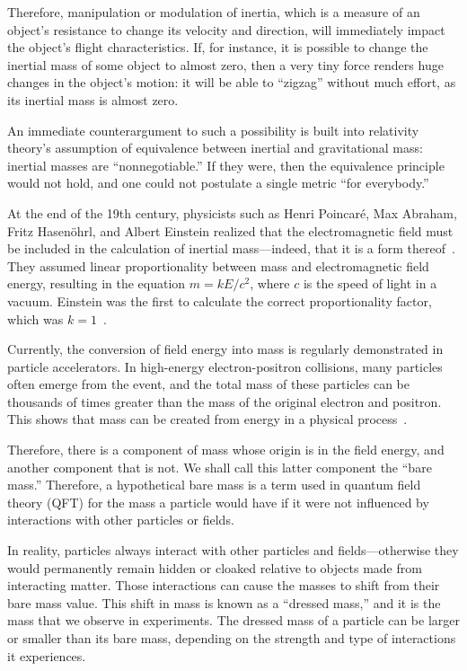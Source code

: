 Therefore, manipulation or modulation of inertia, which is a measure of an object's resistance to change its velocity and direction,
will immediately impact the object's flight characteristics.
If, for instance, it is possible to change the inertial mass of some object to almost zero, then a very tiny force renders huge
changes in the object's motion: it will be able to ``zigzag'' without much effort, as its inertial mass is almost zero.

An immediate counterargument to such a possibility is built into relativity theory's assumption of equivalence between inertial and gravitational mass:
inertial masses are ``nonnegotiable.'' If they were, then the equivalence principle would not hold,
and one could not postulate a single metric ``for everybody.''

At the end of the 19th century, physicists such as Henri Poincar\'e, Max Abraham, Fritz Hasen\"ohrl,
and Albert Einstein realized that the electromagnetic field must be included in the calculation of inertial mass---indeed, that it is a form thereof~\cite{Boughn2011Aug}.
They assumed linear proportionality between mass and electromagnetic field energy, resulting in the equation $m = k E / c^2$, where $c$ is the speed of light in a vacuum.
Einstein was the first to calculate the correct proportionality factor, which was $k=1$~\cite{Einstein1905Jan,Einstein2005Apr}.

Currently, the conversion of field energy into mass is regularly demonstrated in particle accelerators.
In high-energy electron-positron collisions, many particles often emerge from the event, and the total mass of these particles can be thousands of times greater than the mass of the original electron and positron.
This shows that mass can be created from energy in a physical process~\cite{Wilczek2003}.

Therefore, there is a component of mass whose origin is in the field energy,
and another component that is not.
We shall call this latter component the ``bare mass.'' Therefore, a hypothetical bare mass is a term used in quantum field theory (QFT)
for the mass a particle would have if it were not influenced by interactions with other particles or fields.


In reality, particles always interact with other particles and fields---otherwise
they would permanently remain hidden or cloaked relative to objects made from interacting matter.
Those interactions can cause the masses to shift from their bare mass value.
This shift in mass is known as a ``dressed mass,''
and it is the mass that we observe in experiments.
The dressed mass of a particle can be larger or smaller than its bare mass,
depending on the strength and type of interactions it experiences.

